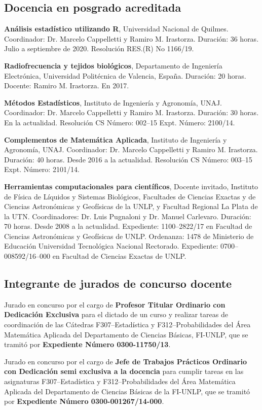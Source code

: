 \documentclass[margin,line]{res}
\begin{document}
\begin{resume}
\subsection{ Docencia en posgrado acreditada}

{\bf Análisis estadístico utilizando R}, Universidad Nacional de Quilmes. Coordinador: Dr. Marcelo Cappelletti y Ramiro M. Irastorza. Duración: 36 horas. Julio a septiembre de 2020. Resolución RES.(R) No 1166/19.

{\bf Radiofrecuencia y tejidos biológicos}, Departamento de Ingeniería Electrónica, Universidad Politécnica de Valencia, España. Duración: 20 horas. Docente: Ramiro M. Irastorza. En 2017.

{\bf Métodos Estadísticos}, Instituto de Ingeniería y Agronomía, UNAJ. Coordinador: Dr. Marcelo Cappelletti y Ramiro M. Irastorza. Duración: 30 horas.  En la actualidad. Resolución CS Número: 002--15 Expt. Número: 2100/14.

{\bf Complementos de Matemática Aplicada}, Instituto de Ingeniería y Agronomía, UNAJ. Coordinador: Dr. Marcelo Cappelletti y Ramiro M. Irastorza. Duración: 40 horas.  Desde 2016 a la actualidad. Resolución CS Número: 003--15 Expt. Número: 2101/14.

{\bf Herramientas computacionales para científicos}, Docente invitado, Instituto de Física de Líquidos y Sistemas Biológicos, Facultades de Ciencias Exactas y de Ciencias Astronómicas y Geofísicas de la UNLP, y Facultad Regional La Plata de la UTN. Coordinadores: Dr. Luis Pugnaloni y Dr. Manuel Carlevaro. Duración: 70 horas. Desde 2008 a la actualidad. Expediente: 1100--2822/17 en Facultad de Ciencias Astronómicas y Geofísicas de UNLP. Ordenanza: 1478 de Ministerio de Educación Universidad Tecnológica Nacional Rectorado. Expediente: 0700--008592/16--000 en Facultad de Ciencias Exactas de UNLP.


\subsection{ Integrante de jurados de concurso docente}

Jurado en concurso por el cargo de {\bf Profesor Titular Ordinario con Dedicación Exclusiva} para el dictado de un curso y realizar tareas de coordinación de las Cátedras  F307--Estadística y F312--Probabilidades del Área Matemática Aplicada del Departamento de Ciencias Básicas, FI-UNLP, que se tramitó por {\bf Expediente Número 0300-11750/13}.

Jurado en concurso por el cargo de {\bf Jefe de Trabajos Prácticos Ordinario con Dedicación semi exclusiva  a la docencia} para cumplir tareas en las asignaturas F307--Estadística y F312--Probabilidades del Área Matemática Aplicada del Departamento de Ciencias Básicas de la FI-UNLP, que se tramitó por {\bf Expediente Número 0300-001267/14-000}.



\end{resume}
\end{document}
